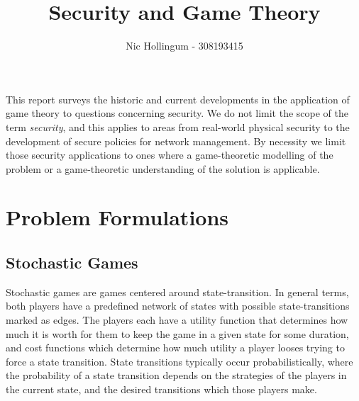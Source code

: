 \documentclass{article}
\author{Nic Hollingum - 308193415}
\title{Security and Game Theory}
\begin{document}
\maketitle

This report surveys the historic and current developments in the application of game theory to questions concerning security.
We do not limit the scope of the term {\em security}, and this applies to areas from real-world physical security to the development of secure policies for network management.
By necessity we limit those security applications to ones where a game-theoretic modelling of the problem or a game-theoretic understanding of the solution is applicable.

\section{Problem Formulations}

\subsection{Stochastic Games}
\label{secStoch}

Stochastic games are games centered around state-transition.
In general terms, both players have a predefined network of states with possible state-transitions marked as edges.
The players each have a utility function that determines how much it is worth for them to keep the game in a given state for some duration, and cost functions which determine how much utility a player looses trying to force a state transition.
State transitions typically occur probabilistically, where the probability of a state transition depends on the strategies of the players in the current state, and the desired transitions which those players make.
\end{document}
